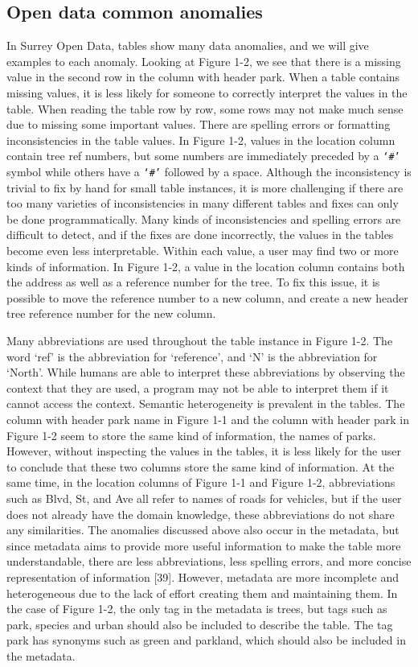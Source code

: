 \subsection{Open data common anomalies}
In Surrey Open Data, tables show many data anomalies, and we will give examples to each anomaly. Looking at Figure 1-2, we see that there is a missing value in the second row in the column with header park. When a table contains missing values, it is less likely for someone to correctly interpret the values in the table. When reading the table row by row, some rows may not make much sense due to missing some important values.
There are spelling errors or formatting inconsistencies in the table values. In Figure 1-2, values in the location column contain tree ref numbers, but some numbers are immediately preceded by a \verb+‘#’+ symbol while others have a \verb+‘#’+ followed by a space. Although the inconsistency is trivial to fix by hand for small table instances, it is more challenging if there are too many varieties of inconsistencies in many different tables and fixes can only be done programmatically. Many kinds of inconsistencies and spelling errors are difficult to detect, and if the fixes are done incorrectly, the values in the tables become even less interpretable.
Within each value, a user may find two or more kinds of information. In Figure 1-2, a value in the location column contains both the address as well as a reference number for the tree. To fix this issue, it is possible to move the reference number to a new column, and create a new header tree reference number for the new column.

Many abbreviations are used throughout the table instance in Figure 1-2. The word ‘ref’ is the abbreviation for ‘reference’, and ‘N’ is the abbreviation for ‘North’. While humans are able to interpret these abbreviations by observing the context that they are used, a program may not be able to interpret them if it cannot access the context.
Semantic heterogeneity is prevalent in the tables. The column with header park name in Figure 1-1 and the column with header park in Figure 1-2 seem to store the same kind of information, the names of parks. However, without inspecting the values in the tables, it is less likely for the user to conclude that these two columns store the same kind of information. At the same time, in the location columns of Figure 1-1 and Figure 1-2, abbreviations such as Blvd, St, and Ave all refer to names of roads for vehicles, but if the user does not already have the domain knowledge, these abbreviations do not share any similarities.
The anomalies discussed above also occur in the metadata, but since metadata aims to provide more useful information to make the table more understandable, there are less abbreviations, less spelling errors, and more concise representation of information [39]. However, metadata are more incomplete and heterogeneous due to the lack of effort creating them and maintaining them. In the case of Figure 1-2, the only tag in the metadata is trees, but tags such as park, species and urban should also be included to describe the table. The tag park has synonyms such as green and parkland, which should also be included in the metadata.

